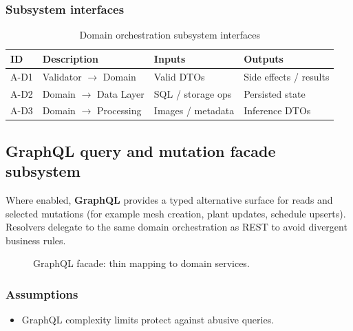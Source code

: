 \subsubsection{Subsystem interfaces}
\begin{table}[H]
\centering
\small
\begin{tabular}{|p{0.9cm}|p{3.4cm}|p{3.0cm}|p{3.5cm}|}
\hline
\textbf{ID} & \textbf{Description} & \textbf{Inputs} & \textbf{Outputs} \\
\hline
A-D1 & Validator $\rightarrow$ Domain & Valid DTOs & Side effects / results \\
\hline
A-D2 & Domain $\rightarrow$ Data Layer & SQL / storage ops & Persisted state \\
\hline
A-D3 & Domain $\rightarrow$ Processing & Images / metadata & Inference DTOs \\
\hline
\end{tabular}
\caption{Domain orchestration subsystem interfaces}
\end{table}

\subsection{GraphQL query and mutation facade subsystem}

Where enabled, \textbf{GraphQL} provides a typed alternative surface for reads and selected mutations (for example mesh creation, plant updates, schedule upserts). Resolvers delegate to the same domain orchestration as REST to avoid divergent business rules.

\begin{figure}[H]
\centering
{}
\caption{GraphQL facade: thin mapping to domain services.}
\label{fig:app-gql}
\end{figure}

\subsubsection{Assumptions}
\begin{itemize}
  \item GraphQL complexity limits protect against abusive queries.
\end{itemize}

